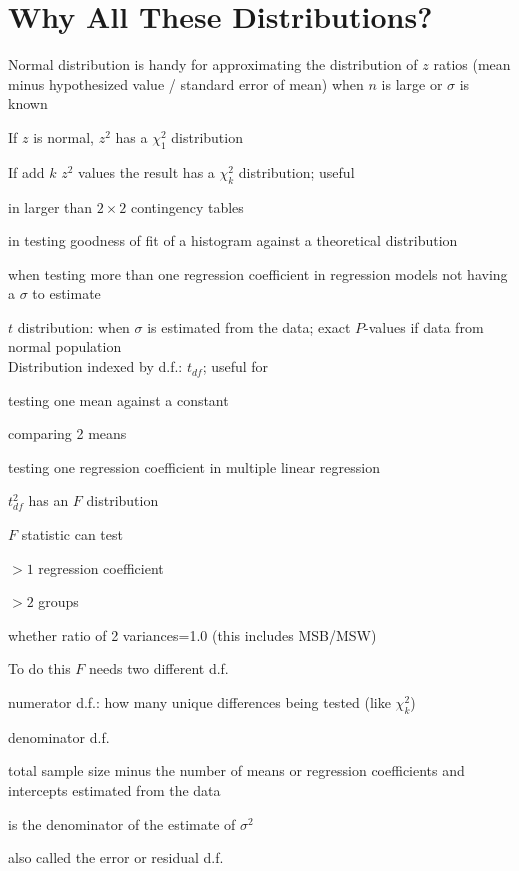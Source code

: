 \section{Why All These Distributions?}
\bi
\item Normal distribution is handy for approximating the distribution
  of $z$ ratios (mean minus hypothesized value / standard error of
  mean) when $n$ is large or $\sigma$ is known
\item If $z$ is normal, $z^2$ has a $\chi^{2}_{1}$ distribution
\item If add $k$ $z^{2}$ values the result has a $\chi^{2}_{k}$
  distribution; useful
 \bi
 \item in larger than $2\times 2$ contingency tables
 \item in testing goodness of fit of a histogram against a theoretical
   distribution
 \item when testing more than one regression coefficient in regression
   models not having a $\sigma$ to estimate
 \ei
\item $t$ distribution: when $\sigma$ is estimated from the data;
  exact $P$-values if data from normal population \\
  Distribution indexed by d.f.: $t_{df}$; useful for
 \bi
 \item testing one mean against a constant
 \item comparing 2 means
 \item testing one regression coefficient in multiple linear regression
 \ei
\item $t_{df}^{2}$ has an $F$ distribution
\item $F$ statistic can test
 \bi
 \item $>1$ regression coefficient
 \item $>2$ groups
 \item whether ratio of 2 variances=1.0 (this includes MSB/MSW)
 \ei
\item To do this $F$ needs two different d.f.
 \bi
 \item numerator d.f.: how many unique differences being tested (like
   $\chi^{2}_{k}$)
 \item denominator d.f.
  \bi
  \item total sample size minus the number of means
   or regression coefficients and intercepts estimated from the data
  \item is the denominator of the estimate of $\sigma^2$
  \item also called the error or residual d.f.
